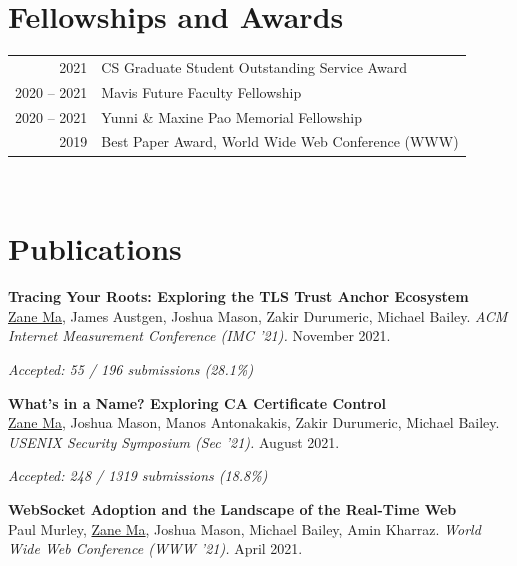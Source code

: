 \documentclass[10pt,singlecolumn]{article} %
\begin{document}
\section{Fellowships and Awards} 

\begin{tabular}{rl}

2021 & CS Graduate Student Outstanding Service Award \\ 

2020 -- 2021 & Mavis Future Faculty Fellowship \\

2020 -- 2021 & Yunni \& Maxine Pao Memorial Fellowship \\

2019 & Best Paper Award, World Wide Web Conference (WWW) \\
\end{tabular}\\

\section{Publications} 


\textbf{Tracing Your Roots: Exploring the TLS Trust Anchor Ecosystem}\\
\underline{Zane Ma}, James Austgen, Joshua Mason, Zakir Durumeric, Michael Bailey.
\textit{ACM Internet Measurement Conference (IMC '21).} November 2021.

{\raggedleft\textit{Accepted: 55 / 196 submissions (28.1\%)}\par}
\vspace{6pt}


\textbf{What's in a Name? Exploring CA Certificate Control}\\
\underline{Zane Ma}, Joshua Mason, Manos Antonakakis, Zakir Durumeric, Michael Bailey.
\textit{USENIX Security Symposium (Sec '21).} August 2021.

{\raggedleft\textit{Accepted: 248 / 1319 submissions (18.8\%)}\par} 
\vspace{6pt}


\textbf{WebSocket Adoption and the Landscape of the Real-Time Web}\\
Paul Murley, \underline{Zane Ma}, Joshua Mason, Michael Bailey, Amin Kharraz.
\textit{World Wide Web Conference (WWW '21).} April 2021.
\end{document}
